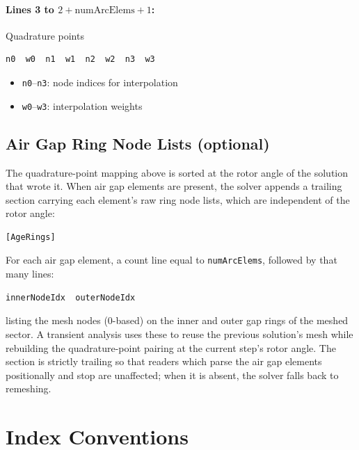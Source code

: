 \documentclass[11pt]{article}
\begin{document}
\paragraph{Lines 3 to $2 + \text{numArcElems} + 1$:} Quadrature points
\begin{lstlisting}
n0  w0  n1  w1  n2  w2  n3  w3
\end{lstlisting}

\begin{itemize}[nosep]
  \item \texttt{n0}--\texttt{n3}: node indices for interpolation
  \item \texttt{w0}--\texttt{w3}: interpolation weights
\end{itemize}

\subsection{Air Gap Ring Node Lists (optional)}

The quadrature-point mapping above is sorted at the rotor angle of the
solution that wrote it.  When air gap elements are present, the solver
appends a trailing section carrying each element's raw ring node lists,
which are independent of the rotor angle:

\begin{lstlisting}
[AgeRings]
\end{lstlisting}

For each air gap element, a count line equal to \texttt{numArcElems},
followed by that many lines:

\begin{lstlisting}
innerNodeIdx  outerNodeIdx
\end{lstlisting}

listing the mesh nodes (0-based) on the inner and outer gap rings of the
meshed sector.  A transient analysis uses these to reuse the previous
solution's mesh while rebuilding the quadrature-point pairing at the
current step's rotor angle.  The section is strictly trailing so that
readers which parse the air gap elements positionally and stop are
unaffected; when it is absent, the solver falls back to remeshing.

\section{Index Conventions}
\end{document}
